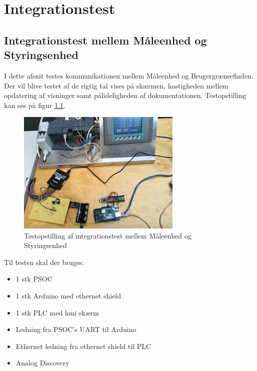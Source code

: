 
\chapter{Integrationstest}

\section{Integrationstest mellem Måleenhed og Styringsenhed}

I dette afsnit testes kommunikationen mellem Måleenhed og Brugergrænsefladen. Der vil blive testet af de rigtig tal vises på skærmen, hastigheden mellem opdatering af visninger samt pålideligheden af dokumentationen. Testopstilling kan ses på figur \ref{fig:opstilling1}.

\begin{figure}[htbp] %
	\centering
	\includegraphics[width=0.7\textwidth]{Test/Opstilling1}
	\caption{Testopstilling af integrationstest mellem Måleenhed og Styringsenhed}
	\label{fig:opstilling1}
\end{figure}

Til testen skal der bruges:
\begin{itemize}
	\item 1 stk PSOC
	\item 1 stk Arduino med ethernet shield
	\item 1 stk PLC med hmi skærm
	\item Ledning fra PSOC's UART til Arduino
	\item Ethernet ledning fra ethernet shield til PLC
	\item Analog Discovery
\end{itemize}

